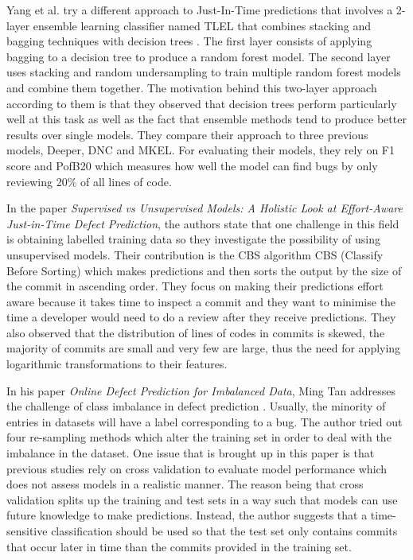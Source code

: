 \documentclass[../main.tex]{subfiles}
\begin{document}
Yang et al. try a different approach to Just-In-Time predictions that involves a 2-layer ensemble learning classifier named TLEL that combines stacking and bagging techniques with decision trees \cite{yang2017tlel}. The first layer consists of applying bagging to a decision tree to produce a random forest model. The second layer uses stacking and random undersampling to train multiple random forest models and combine them together. The motivation behind this two-layer approach according to them is that they observed that decision trees perform particularly well at this task as well as the fact that ensemble methods tend to produce better results over single models. They compare their approach to three previous models, Deeper, DNC and MKEL. For evaluating their models, they rely on F1 score and PofB20 which measures how well the model can find bugs by only reviewing 20\% of all lines of code. 

In the paper \textit{Supervised vs Unsupervised Models: A Holistic Look at Effort-Aware Just-in-Time Defect Prediction}, the authors state that one challenge in this field is obtaining labelled training data so they investigate the possibility of using unsupervised models. Their contribution is the CBS algorithm CBS (Classify Before Sorting) which makes predictions and then sorts the output by the size of the commit in ascending order. They focus on making their predictions effort aware because it takes time to inspect a commit and they want to minimise the time a developer would need to do a review after they receive predictions. They also observed that the distribution of lines of codes in commits is skewed, the majority of commits are small and very few are large, thus the need for applying logarithmic transformations to their features.

In his paper \textit{Online Defect Prediction for Imbalanced Data}, Ming Tan addresses the challenge of class imbalance in defect prediction \cite{tan2015online}. Usually, the minority of entries in datasets will have a label corresponding to a bug. The author tried out four re-sampling methods which alter the training set in order to deal with the imbalance in the dataset. One issue that is brought up in this paper is that previous studies rely on cross validation to evaluate model performance which does not assess models in a realistic manner. The reason being that cross validation splits up the training and test sets in a way such that models can use future knowledge to make predictions. Instead, the author suggests that a time-sensitive classification should be used so that the test set only contains commits that occur later in time than the commits provided in the training set. 
\end{document}
